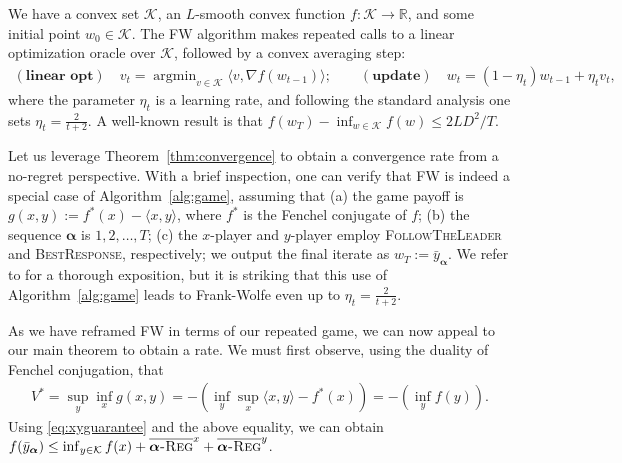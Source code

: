 \documentclass[pmlr]{jmlr} %
\def\reals{\mathbb{R}}
\def\reals{\mathbb{R}}
\def\K{\mathcal{K}}
\def\argmin{\mathop{\arg\min}}
\def\balpha{\boldsymbol{\alpha}}
\def\FTL{\textsc{FollowTheLeader}\xspace}
\def\BR{\textsc{BestResponse}\xspace}
\newcommand{\avgregret}[1]{\overline{\balpha\textsc{-Reg}}^{#1}}
\begin{document}
We have a convex set $\K$, an $L$-smooth convex function $f : \K \to \reals$, and some initial point $w_{0} \in \K$.
The FW algorithm makes repeated calls to a linear optimization oracle over $\K$, followed by a convex averaging step:
\begin{equation*}
\begin{aligned}
\textstyle(\textbf{linear opt}) \quad v_{t} = \argmin_{v \in \K} \langle v, \nabla f(w_{t-1})  \rangle; \quad \quad (\textbf{update}) \quad  w_{t} = (1 - \eta_{t}) w_{t-1} + \eta_{t} v_{t},
\end{aligned}
\end{equation*}
where the parameter $\eta_{t}$ is a learning rate, and following the standard analysis one sets $\eta_{t} = \frac 2 {t + 2}$. A well-known result is that $f(w_{T}) - \inf_{w \in \K} f(w) \leq {2L D^{2}}/{T}$.

Let us leverage Theorem~\ref{thm:convergence} to obtain a convergence rate from a no-regret perspective. With a brief inspection, one can verify that FW is indeed a special case of Algorithm~\ref{alg:game}, assuming that (a) the game payoff is $g(x,y) := f^{*}(x) - \langle x, y \rangle$, where $f^{*}$ is the Fenchel conjugate of $f$; (b) the sequence $\balpha$ is $1, 2, \ldots, T$; (c) the $x$-player and $y$-player employ \FTL and \BR, respectively; we output the final iterate as $w_{T} := \bar y_{\balpha}$. We refer to \citet{AW17} for a thorough exposition, but it is striking that this use of Algorithm~\ref{alg:game} leads to Frank-Wolfe even up to $\eta_{t} = \frac{2}{t+2}$.

As we have reframed FW in terms of our repeated game, we can now appeal to our main theorem to obtain a rate. We must first observe, using the duality of Fenchel conjugation, that 
\begin{align}
\textstyle	V^{*} = \sup_{y} \inf_{x}  g(x,y) = - (\inf_{y} \sup_{x}  \langle x, y \rangle - f^{*}(x)) = - (\inf_{y} f(y)).\label{eq:fwgamevalue}
\end{align}
Using \eqref{eq:xyguarantee} and the above equality, we can obtain $f(\bar y_{\balpha}) \leq \inf_{y \in \K} f(x) + \avgregret{x} + \avgregret{y}$.
\end{document}
